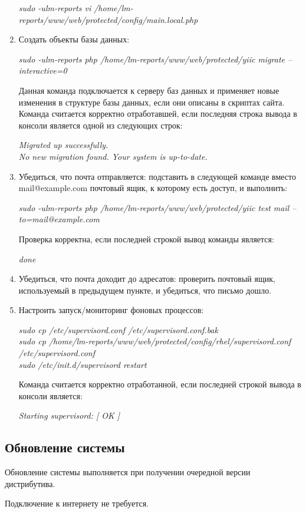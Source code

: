 \begin{enumerate}
{\textit{sudo -ulm-reports vi /home/lm-reports/www/web/protected/config/main.local.php
}
}
\item{
Создать объекты базы данных:

\textit{sudo -ulm-reports php /home/lm-reports/www/web/protected/yiic migrate --interactive=0
}

Данная команда подключается к серверу баз данных и применяет новые изменения в структуре базы данных, если они описаны в скриптах сайта. Команда считается корректно отработавшей, если последняя строка вывода в консоли является одной из следующих строк:

\textit{Migrated up successfully.\\
No new migration found. Your system is up-to-date.
}
}
\item{
Убедиться, что почта отправляется: подставить в следующей команде вместо mail@example.com почтовый ящик, к которому есть доступ, и выполнить:

\textit{sudo -ulm-reports php /home/lm-reports/www/web/protected/yiic test mail --to=mail@example.com
}

Проверка корректна, если последней строкой вывод команды является:

\textit{
	done
}

}
\item{
Убедиться, что почта доходит до адресатов: проверить почтовый ящик, используемый в предыдущем пункте, и убедиться, что письмо дошло.
}
\item{
Настроить запуск/мониторинг фоновых процессов:

\textit{sudo cp /etc/supervisord.conf /etc/supervisord.conf.bak\\
sudo cp /home/lm-reports/www/web/protected/config/rhel/supervisord.conf /etc/supervisord.conf\\
sudo /etc/init.d/supervisord restart
}

Команда считается корректно отработанной, если последней строкой вывода в консоли является:

\textit{
Starting supervisord:          [  OK  ]
}
}
\end{enumerate}

\subsection*{Обновление системы}

Обновление системы выполняется при получении очередной версии дистрибутива.

Подключение к интернету не требуется.

